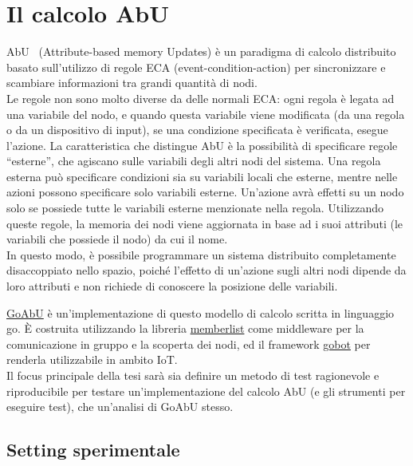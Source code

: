 \documentclass{article}
\begin{document}
\newpage
\tableofcontents

\newpage
\section{Il calcolo AbU}

AbU~\cite{MP-ICTAC-2021} (Attribute-based memory Updates) è un paradigma di calcolo distribuito basato sull'utilizzo di regole ECA (event-condition-action) per sincronizzare e scambiare informazioni tra grandi quantità di nodi.\\
Le regole non sono molto diverse da delle normali ECA: ogni regola è legata ad una variabile del nodo, e quando questa variabile viene modificata (da una regola o da un dispositivo di input), se una condizione specificata è verificata, esegue l'azione.
La caratteristica che distingue AbU è la possibilità di specificare regole ``esterne'', che agiscano sulle variabili degli altri nodi del sistema. Una regola esterna può specificare condizioni sia su variabili locali che esterne, mentre nelle azioni possono specificare solo variabili esterne. Un'azione avrà effetti su un nodo solo se possiede tutte le variabili esterne menzionate nella regola.
Utilizzando queste regole, la memoria dei nodi viene aggiornata in base ad i suoi attributi (le variabili che possiede il nodo) da cui il nome.\\
In questo modo, è possibile programmare un sistema distribuito completamente disaccoppiato nello spazio, poiché l'effetto di un'azione sugli altri nodi dipende da loro attributi e non richiede di conoscere la posizione delle variabili.

\href{https://github.com/abu-lang/goabu}{GoAbU} è un'implementazione di questo modello di calcolo scritta in linguaggio go.
È costruita utilizzando la libreria \href{https://github.com/hashicorp/memberlist}{memberlist} come middleware per la comunicazione in gruppo e la scoperta dei nodi, ed il framework \href{https://github.com/hybridgroup/gobot/}{gobot} per renderla utilizzabile in ambito IoT.\\
Il focus principale della tesi sarà sia definire un metodo di test ragionevole e riproducibile per testare un'implementazione del calcolo AbU (e gli strumenti per eseguire test), che un'analisi di GoAbU stesso.

\subsection{Setting sperimentale}
\end{document}

